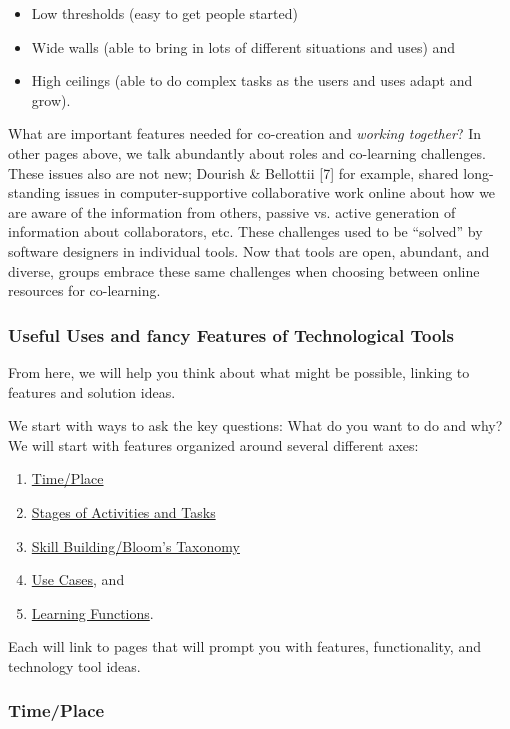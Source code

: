 \begin{itemize}[noitemsep]
\item
  Low thresholds (easy to get people started)
\item
  Wide walls (able to bring in lots of different situations and uses)
  and
\item
  High ceilings (able to do complex tasks as the users and uses adapt
  and grow).
\end{itemize}
What are important features needed for co-creation and \emph{working
together}? In other pages above, we talk abundantly about roles and
co-learning challenges. These issues also are not new; Dourish \&
Bellottii {[}7{]} for example, shared long-standing issues in
computer-supportive collaborative work online about how we are aware of
the information from others, passive vs. active generation of
information about collaborators, etc. These challenges used to be
``solved'' by software designers in individual tools. Now that tools are
open, abundant, and diverse, groups embrace these same challenges when
choosing between online resources for co-learning.

\subsubsection{Useful Uses and fancy Features of Technological Tools}

From here, we will help you think about what might be possible, linking
to features and solution ideas.

We start with ways to ask the key questions: What do you want to do and
why? We will start with features organized around several different
axes:

\begin{enumerate}
\item
  \href{\#time-place}{Time/Place}
\item
  \href{\#stages}{Stages of Activities and Tasks}
\item
  \href{\#skill}{Skill Building/Bloom's Taxonomy}
\item
  \href{\#use}{Use Cases}, and
\item
  \href{\#functions}{Learning Functions}.
\end{enumerate}
Each will link to pages that will prompt you with features,
functionality, and technology tool ideas.

\subsubsection{Time/Place}

